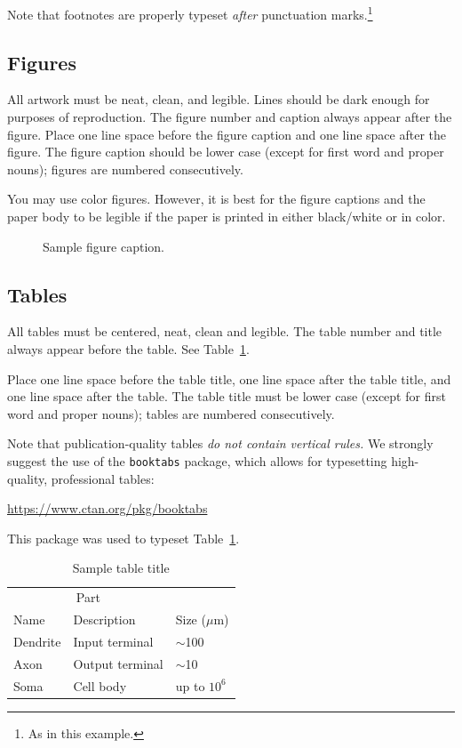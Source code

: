 \documentclass{article}
\begin{document}
Note that footnotes are properly typeset \emph{after} punctuation
marks.\footnote{As in this example.}

\subsection{Figures}

All artwork must be neat, clean, and legible. Lines should be dark
enough for purposes of reproduction. The figure number and caption
always appear after the figure. Place one line space before the figure
caption and one line space after the figure. The figure caption should
be lower case (except for first word and proper nouns); figures are
numbered consecutively.

You may use color figures.  However, it is best for the figure
captions and the paper body to be legible if the paper is printed in
either black/white or in color.
\begin{figure}[ht]
  \centering
  \fbox{\rule[-.5cm]{0cm}{4cm} \rule[-.5cm]{4cm}{0cm}}
  \caption{Sample figure caption.}
\end{figure}

\subsection{Tables}

All tables must be centered, neat, clean and legible.  The table
number and title always appear before the table.  See
Table~\ref{sample-table}.

Place one line space before the table title, one line space after the
table title, and one line space after the table. The table title must
be lower case (except for first word and proper nouns); tables are
numbered consecutively.

Note that publication-quality tables \emph{do not contain vertical
  rules.} We strongly suggest the use of the \verb+booktabs+ package,
which allows for typesetting high-quality, professional tables:
\begin{center}
  \url{https://www.ctan.org/pkg/booktabs}
\end{center}
This package was used to typeset Table~\ref{sample-table}.

\begin{table}[t]
  \caption{Sample table title}
  \label{sample-table}
  \centering
  \begin{tabular}{lll}
    \toprule
    \multicolumn{2}{c}{Part}                   \\
    \cmidrule{1-2}
    Name     & Description     & Size ($\mu$m) \\
    \midrule
    Dendrite & Input terminal  & $\sim$100     \\
    Axon     & Output terminal & $\sim$10      \\
    Soma     & Cell body       & up to $10^6$  \\
    \bottomrule
  \end{tabular}
\end{table}
\end{document}
